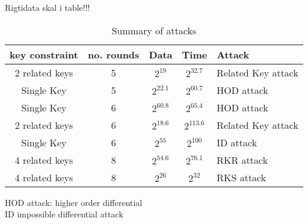 Rigtidata skal i table!!!
\begin{table}[h]
\centering
\caption{Summary of attacks}
\label{my-label}
\begin{tabular}{ccccl}
\hline
\multicolumn{1}{|l|}{key constraint} & \multicolumn{1}{l|}{no. rounds} & \multicolumn{1}{l|}{Data} & \multicolumn{1}{l|}{Time} & \multicolumn{1}{l|}{Attack}            \\ \hline
2 related keys                       & 5                               & $2^{19}$                  & $2^{32.7}$                & \multicolumn{1}{c}{Related Key attack} \\ \hline
Single Key                           & 5                               & $2^{22.1}$                & $2^{60.7}$                & HOD attack                             \\ \hline
Single Key                           & 6                               & $2^{60.8}$                & $2^{65.4}$                & HOD attack                             \\ \hline
2 related keys                       & 6                               & $2^{18.6}$                & $2^{113.6}$               & Related Key attack                     \\ \hline
Single Key                           & 6                               & $2^{55}$                  & $2^{100}$                 & ID attack                              \\ \hline
4 related keys                       & 8                               & $2^{54.6}$                  & $2^{76.1}$               & RKR attack                     \\ \hline
4 related keys                       & 8                               & $2^{26}$                  & $2^{32}$                  & RKS attack
\end{tabular}
HOD attack: higher order differential\\
ID impossible differential attack
\end{table}



